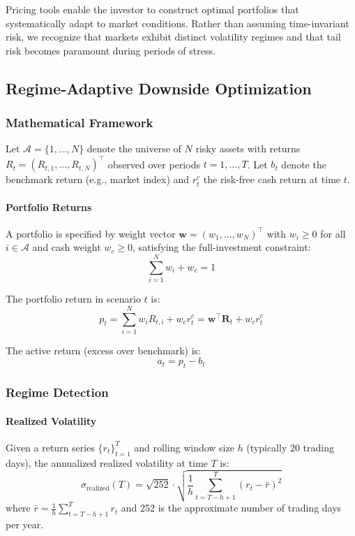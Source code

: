 Pricing tools enable the investor to construct optimal portfolios that systematically adapt to market conditions. Rather than assuming time-invariant risk, we recognize that markets exhibit distinct volatility regimes and that tail risk becomes paramount during periods of stress.

\subsection{Regime-Adaptive Downside Optimization}

\subsubsection{Mathematical Framework}

Let $\mathcal{A} = \{1, \ldots, N\}$ denote the universe of $N$ risky assets with returns $R_t = (R_{t,1}, \ldots, R_{t,N})^\top$ observed over periods $t = 1, \ldots, T$. Let $b_t$ denote the benchmark return (e.g., market index) and $r^c_t$ the risk-free cash return at time $t$.

\paragraph{Portfolio Returns}

A portfolio is specified by weight vector $\mathbf{w} = (w_1, \ldots, w_N)^\top$ with $w_i \geq 0$ for all $i \in \mathcal{A}$ and cash weight $w_c \geq 0$, satisfying the full-investment constraint:
\[
\sum_{i=1}^N w_i + w_c = 1
\]

The portfolio return in scenario $t$ is:
\[
p_t = \sum_{i=1}^N w_i R_{t,i} + w_c r^c_t = \mathbf{w}^\top \mathbf{R}_t + w_c r^c_t
\]

The active return (excess over benchmark) is:
\[
a_t = p_t - b_t
\]

\subsubsection{Regime Detection}

\paragraph{Realized Volatility}

Given a return series $\{r_t\}_{t=1}^{T}$ and rolling window size $h$ (typically 20 trading days), the annualized realized volatility at time $T$ is:
\[
\sigma_{\text{realized}}(T) = \sqrt{252} \cdot \sqrt{\frac{1}{h} \sum_{t=T-h+1}^{T} (r_t - \bar{r})^2}
\]
where $\bar{r} = \frac{1}{h}\sum_{t=T-h+1}^{T} r_t$ and 252 is the approximate number of trading days per year.

